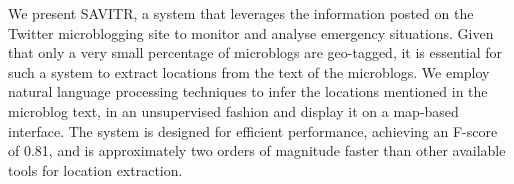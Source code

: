 We present SAVITR, a system that leverages the information posted on the Twitter microblogging site to monitor and analyse emergency situations.
Given that only a very small percentage of microblogs are geo-tagged, it is essential for such a system to extract locations from the text of the microblogs.
We employ natural language processing techniques to infer the locations mentioned in the microblog text, in an unsupervised fashion and display it on a map-based interface. 
The system is designed for efficient performance, achieving an F-score of 0.81, and is approximately two orders of magnitude faster than other available tools for location extraction. 







